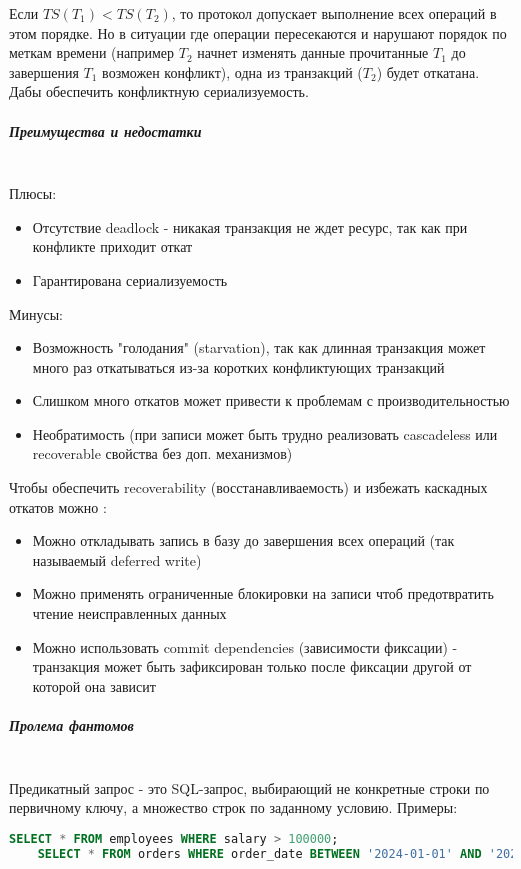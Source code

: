 Если $TS(T_1) < TS(T_2)$, то протокол допускает выполнение всех операций в этом порядке. Но в ситуации где операции пересекаются и нарушают порядок по меткам времени (например $T_2$ начнет изменять данные прочитанные $T_1$ до завершения $T_1$ \textrightarrow возможен конфликт), одна из транзакций ($T_2$) будет откатана. Дабы обеспечить конфликтную сериализуемость.

\subparagraph{Преимущества и недостатки} ~\\
Плюсы:
\begin{itemize}
    \item Отсутствие deadlock - никакая транзакция не ждет ресурс, так как при конфликте приходит откат
    \item Гарантирована сериализуемость
\end{itemize}

Минусы:
\begin{itemize}
    \item Возможность "голодания" (starvation), так как длинная транзакция может много раз откатываться из-за коротких конфликтующих транзакций
    \item Слишком много откатов может привести к проблемам с производительностью
    \item Необратимость (при записи может быть трудно реализовать cascadeless или recoverable свойства без доп. механизмов) \autocite{Silberschatz}
\end{itemize}

Чтобы обеспечить recoverability (восстанавливаемость) и избежать каскадных откатов можно \autocite{Silberschatz, ElmasriNavathe}:
\begin{itemize}
    \item Можно откладывать запись в базу до завершения всех операций (так называемый deferred write)
    \item Можно применять ограниченные блокировки на записи чтоб предотвратить чтение неисправленных данных
    \item Можно использовать commit dependencies (зависимости фиксации) - транзакция может быть зафиксирован только после фиксации другой от которой она зависит
\end{itemize}

\subparagraph{Пролема фантомов} ~\\

Предикатный запрос - это SQL-запрос, выбирающий не конкретные строки по первичному ключу, а множество строк по заданному условию. Примеры:
\begin{lstlisting}[language=SQL]
    SELECT * FROM employees WHERE salary > 100000;
    SELECT * FROM orders WHERE order_date BETWEEN '2024-01-01' AND '2024-03-01';       
\end{lstlisting}

